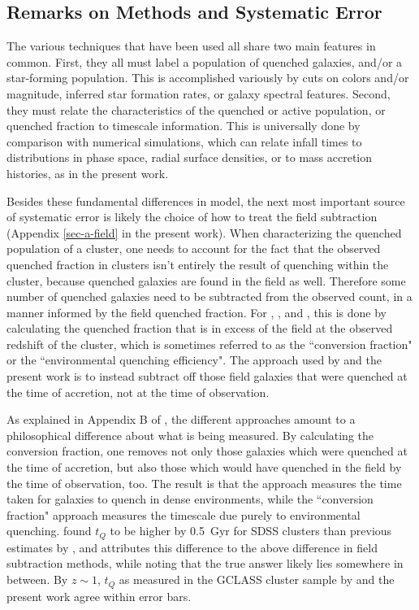 \subsection{Remarks on Methods and Systematic Error}

The various techniques that have been used all share two main features in common.
First, they all must label a population of quenched galaxies, and/or a star-forming population.
This is accomplished variously by cuts on colors and/or magnitude, inferred star formation rates, or galaxy spectral features.
Second, they must relate the characteristics of the quenched or active population, or quenched fraction to timescale information.
This is universally done by comparison with numerical simulations, which can relate infall times to distributions in phase space, radial surface densities, or to mass accretion histories, as in the present work.

Besides these fundamental differences in model, the next most important source of systematic error is likely the choice of how to treat the field subtraction (Appendix \ref{sec-a-field} in the present work).
When characterizing the quenched population of a cluster, one needs to account for the fact that the observed quenched fraction in clusters isn't entirely the result of quenching within the cluster, because quenched galaxies are found in the field as well.
Therefore some number of quenched galaxies need to be subtracted from the observed count, in a manner informed by the field quenched fraction.
For \citet{McGee:2011aa}, \citet{Balogh:2016aa}, and \cite{Fossati:2017aa}, this is done by calculating the quenched fraction that is in excess of the field at the observed redshift of the cluster, which is sometimes referred to as the ``conversion fraction" or the ``environmental quenching efficiency".
The approach used by \citet{Wetzel:2013aa} and the present work is to instead subtract off those field galaxies that were quenched at the time of accretion, not at the time of observation.

As explained in Appendix B of \citet{Balogh:2016aa}, the different approaches amount to a philosophical difference about what is being measured.
By calculating the conversion fraction, one removes not only those galaxies which were quenched at the time of accretion, but also those which would have quenched in the field by the time of observation, too.
The result is that the \citet{Wetzel:2013aa} approach measures the time taken for galaxies to quench in dense environments, while the ``conversion fraction" approach measures the timescale due purely to environmental quenching.
\citet{Balogh:2016aa} found $t_Q$ to be higher by 0.5~Gyr for SDSS clusters than previous estimates by \citet{Wetzel:2013aa}, and attributes this difference to the above difference in field subtraction methods, while noting that the true answer likely lies somewhere in between.
By $z\sim1$, $t_Q$ as measured in the GCLASS cluster sample by \citet{Balogh:2016aa} and the present work agree within error bars.

